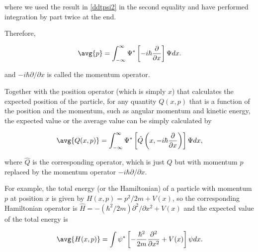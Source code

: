 \documentclass[a4paper,12pt]{report}
\begin{document}
where we used the result in \cref{ddtpsi2} in the second equality and have performed integration by part twice at the end.
	
Therefore,

\begin{equation}
  \avg{p} = \int_{-\infty}^{\infty} \Psi ^* \left[-i\hbar \frac{\partial }{\partial x} \right] \Psi dx.
\end{equation}

and \(-i\hbar \partial / \partial x \) is called the momentum operator. 

Together with the position operator (which is simply \(x\)) that calculates the expected position of the particle, for any quantity \(Q(x,p)\) that is a function of the position and the momentum, such as angular momentum and kinetic energy, the expected value or the average value can be simply calculated by 
	
\begin{equation}
  \avg{Q(x,p)} = \int_{-\infty}^{\infty} \Psi ^* \left[\hat{Q} \left(x, -i\hbar \frac{\partial }{\partial x} \right)\right] \Psi dx, \label{expectedvalues} 
\end{equation}

where \(\hat{Q}\) is the corresponding operator, which is just \(Q\) but with momentum \(p\) replaced by the momentum operator \( -i \hbar \partial /\partial x \).   

For example, the total energy (or the Hamiltonian) of a particle with momentum \(p\) at position \(x\) is given by \( H(x,p) = p^2 /2m + V(x) \), so the corresponding Hamiltonian operator is \( \hat{H} = - (\hbar ^2 /2m )\partial ^2 / \partial x^2 +V(x)\) and the expected value of the total energy is 

\begin{equation}
  \avg{H(x,p)} = \int \psi ^* \left[ - \frac{\hbar ^2}{2m}\frac{\partial^2 }{\partial x^2} +V(x) \right]\psi dx. \label{Hamil} 
\end{equation}
\end{document}
